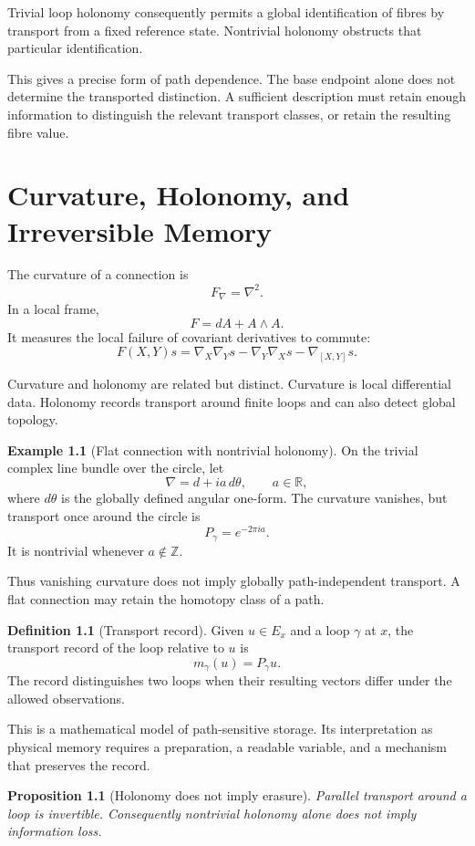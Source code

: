 \documentclass[11pt,oneside]{book}
\newtheorem{proposition}[theorem]{Proposition}
\theoremstyle{definition}
\newtheorem{definition}[theorem]{Definition}
\newtheorem{example}[theorem]{Example}
\theoremstyle{remark}
\newcommand{\R}{\mathbb{R}}
\begin{document}
Trivial loop holonomy consequently permits a global identification
of fibres by transport from a fixed reference state. Nontrivial
holonomy obstructs that particular identification.

This gives a precise form of path dependence. The base endpoint
alone does not determine the transported distinction. A sufficient
description must retain enough information to distinguish the
relevant transport classes, or retain the resulting fibre value.


\chapter{Curvature, Holonomy, and Irreversible Memory}

The curvature of a connection is
\[
F_\nabla=\nabla^2.
\]
In a local frame,
\[
F=dA+A\wedge A.
\]
It measures the local failure of covariant derivatives to commute:
\[
F(X,Y)s
=
\nabla_X\nabla_Ys
-
\nabla_Y\nabla_Xs
-
\nabla_{[X,Y]}s.
\]

Curvature and holonomy are related but distinct. Curvature is
local differential data. Holonomy records transport around finite
loops and can also detect global topology.

\begin{example}[Flat connection with nontrivial holonomy]
On the trivial complex line bundle over the circle, let
\[
\nabla=d+ia\,d\theta,
\qquad a\in\R,
\]
where $d\theta$ is the globally defined angular one-form.
The curvature vanishes, but transport once around the circle is
\[
P_\gamma=e^{-2\pi ia}.
\]
It is nontrivial whenever $a\notin\mathbb Z$.
\end{example}

Thus vanishing curvature does not imply globally path-independent
transport. A flat connection may retain the homotopy class of a
path.

\begin{definition}[Transport record]
Given $u\in E_x$ and a loop $\gamma$ at $x$, the transport record
of the loop relative to $u$ is
\[
m_\gamma(u)=P_\gamma u.
\]
The record distinguishes two loops when their resulting vectors
differ under the allowed observations.
\end{definition}

This is a mathematical model of path-sensitive storage.
Its interpretation as physical memory requires a preparation,
a readable variable, and a mechanism that preserves the record.

\begin{proposition}[Holonomy does not imply erasure]
Parallel transport around a loop is invertible. Consequently
nontrivial holonomy alone does not imply information loss.
\end{proposition}
\end{document}
